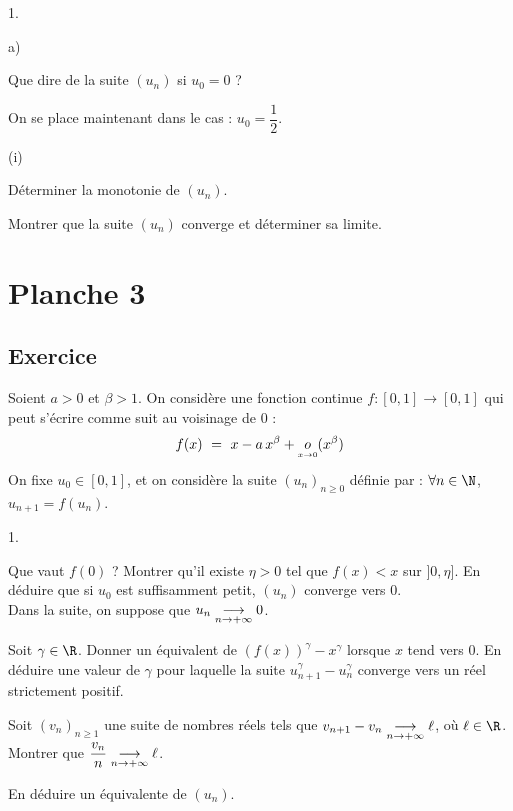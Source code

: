 \documentclass[11pt]{article}%
\begin{document}
\begin{noliste}{1.}
\begin{noliste}{a)}
    \item Que dire de la suite $(u_n)$ si $u_0=0$ ?
    
    \item On se place maintenant dans le cas : $u_0= \dfrac{1}{2}$.
    \begin{nonoliste}{(i)}
     \item Déterminer la monotonie de $(u_n)$.
     
     \item Montrer que la suite $(u_n)$ converge et 
     déterminer sa limite.
    \end{nonoliste}
  \end{noliste}
\end{noliste}



\newpage




\section*{Planche 3}



\subsection*{Exercice} %

\noindent
Soient $a>0$ et $\beta>1$. On considère une fonction continue $f : 
[0,1] \to [0,1]$ qui peut s'écrire comme suit au voisinage de $0$ :
\[
 f(x) \ = \ x - a \, x^\beta + {\underset {{\overset {x\rightarrow 0}{}}}{o}}(x^\beta)
\]
On fixe $u_0 \in [0,1]$, et on considère la suite $(u_n)_{n\geq 0}$ 
définie par : $\forall n \in \N$, $u_{n+1} = f(u_n)$.
\begin{noliste}{1.}
 \item Que vaut $f(0)$ ? Montrer qu'il existe $\eta >0$ tel que $f(x) 
 <x$ sur $]0,\eta]$. En déduire que si $u_0$ est suffisamment petit, 
 $(u_n)$ converge vers $0$.\\
 Dans la suite, on suppose que $u_n \underset{n\to +\infty}{\longrightarrow} 0$.
 
 \item Soit $\gamma \in \R$. Donner un équivalent de $(f(x))^\gamma - 
 x^\gamma$ lorsque $x$ tend vers $0$. En déduire une valeur de $
 \gamma$ pour laquelle la suite $u_{n+1}^\gamma - u_n^\gamma$ 
 converge vers un réel strictement positif.
 
 \item Soit $(v_n)_{n\geq 1}$ une suite de nombres réels tels que 
 $v_{n+1}-v_n \underset{n\to +\infty}{\longrightarrow} \ell$, où $\ell \in \R$. Montrer que $
 \dfrac{v_n}{n} \underset{n\to +\infty}{\longrightarrow} \ell$.
 
 \item En déduire un équivalente de $(u_n)$.
\end{noliste}
\end{document}
